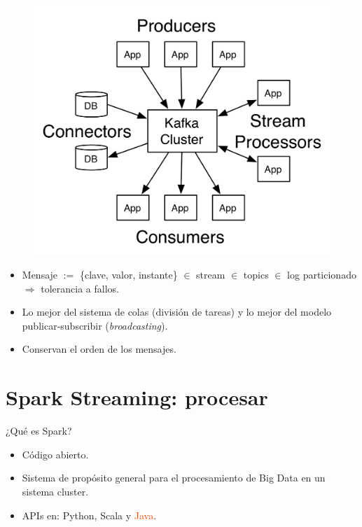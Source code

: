 \documentclass[dvipsnames]{beamer}
\begin{document}
	\begin{frame}
          \begin{figure}[H]
            \centering
            \includegraphics[scale=0.7]{img/kafka-apis.png}
          \end{figure}
          \begin{itemize}
          \item Mensaje $:=$ \{clave, valor, instante\} $\in$ stream $\in$ topics $\in$ log particionado $\Rightarrow$ \textcolor{deepRed}{tolerancia a fallos}.
          \item Lo mejor del sistema de colas (división de tareas) y lo mejor del modelo publicar-subscribir (\textit{broadcasting}).
          \item Conservan el orden de los mensajes.
          \end{itemize}
	\end{frame}
	
	\section{Spark Streaming: procesar}
	
	\begin{frame}
          ¿Qué es Spark?
          \begin{itemize}
          \item Código abierto.
          \item Sistema de propósito general para el procesamiento de Big Data en un sistema cluster.
          \item APIs en: \textcolor{deepBlue}{Python}, \textcolor{deepRed}{Scala} y \textcolor{orangeRed}{Java}.
          \end{itemize}
	\end{frame}	
	
\end{document}

